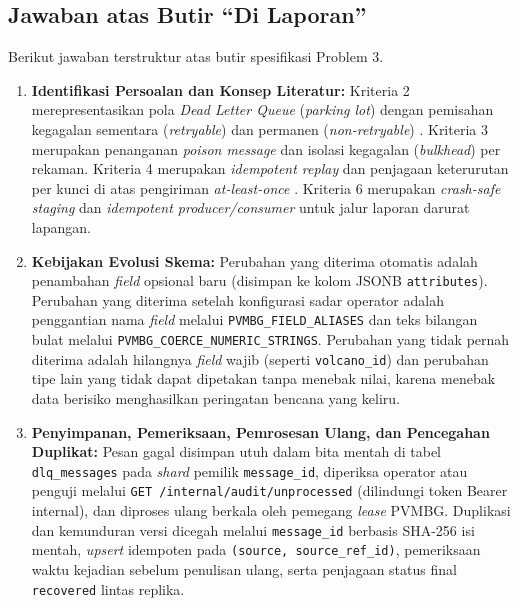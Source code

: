 \subsection{Jawaban atas Butir ``Di Laporan''}
Berikut jawaban terstruktur atas butir spesifikasi Problem 3.
\begin{enumerate}
    \item \textbf{Identifikasi Persoalan dan Konsep Literatur:} Kriteria 2 merepresentasikan pola \textit{Dead Letter Queue} (\textit{parking lot}) dengan pemisahan kegagalan sementara (\textit{retryable}) dan permanen (\textit{non-retryable}) \cite{hohpe2003enterprise}. Kriteria 3 merupakan penanganan \textit{poison message} dan isolasi kegagalan (\textit{bulkhead}) per rekaman. Kriteria 4 merupakan \textit{idempotent replay} dan penjagaan keterurutan per kunci di atas pengiriman \textit{at-least-once} \cite{kleppmann2017designing}. Kriteria 6 merupakan \textit{crash-safe staging} dan \textit{idempotent producer/consumer} untuk jalur laporan darurat lapangan.
    \item \textbf{Kebijakan Evolusi Skema:} Perubahan yang diterima otomatis adalah penambahan \textit{field} opsional baru (disimpan ke kolom JSONB \texttt{attributes}). Perubahan yang diterima setelah konfigurasi sadar operator adalah penggantian nama \textit{field} melalui \texttt{PVMBG\_FIELD\_ALIASES} dan teks bilangan bulat melalui \texttt{PVMBG\_COERCE\_NUMERIC\_STRINGS}. Perubahan yang tidak pernah diterima adalah hilangnya \textit{field} wajib (seperti \texttt{volcano\_id}) dan perubahan tipe lain yang tidak dapat dipetakan tanpa menebak nilai, karena menebak data berisiko menghasilkan peringatan bencana yang keliru.
    \item \textbf{Penyimpanan, Pemeriksaan, Pemrosesan Ulang, dan Pencegahan Duplikat:} Pesan gagal disimpan utuh dalam bita mentah di tabel \texttt{dlq\_messages} pada \textit{shard} pemilik \texttt{message\_id}, diperiksa operator atau penguji melalui \texttt{GET /internal/audit/unprocessed} (dilindungi token Bearer internal), dan diproses ulang berkala oleh pemegang \textit{lease} PVMBG. Duplikasi dan kemunduran versi dicegah melalui \texttt{message\_id} berbasis SHA-256 isi mentah, \textit{upsert} idempoten pada \texttt{(source, source\_ref\_id)}, pemeriksaan waktu kejadian sebelum penulisan ulang, serta penjagaan status final \texttt{recovered} lintas replika.

\end{enumerate}
